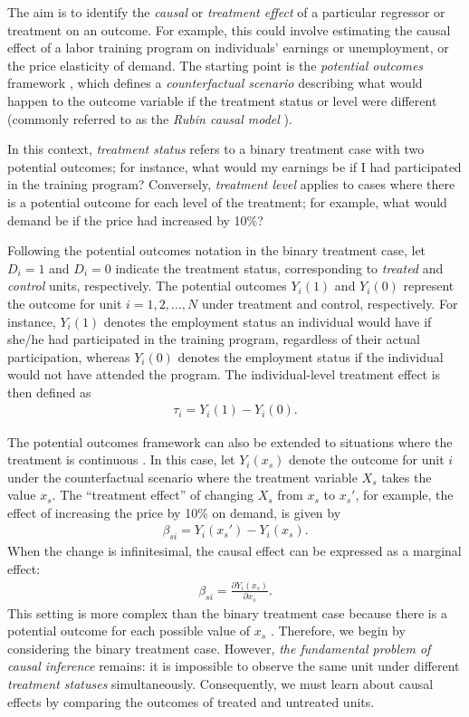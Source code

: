 The aim is to identify the \textit{causal} or \textit{treatment effect} of a particular regressor or treatment on an outcome. For example, this could involve estimating the causal effect of a labor training program on individuals’ earnings or unemployment, or the price elasticity of demand. The starting point is the \textit{potential outcomes} framework \cite{rubin1974}, which defines a \textit{counterfactual scenario} describing what would happen to the outcome variable if the treatment status or level were different (commonly referred to as the \textit{Rubin causal model} \cite{holland1986statistics}).

In this context, \textit{treatment status} refers to a binary treatment case with two potential outcomes; for instance, what would my earnings be if I had participated in the training program? Conversely, \textit{treatment level} applies to cases where there is a potential outcome for each level of the treatment; for example, what would demand be if the price had increased by 10\%?

Following the potential outcomes notation in the binary treatment case, let $D_i = 1$ and $D_i = 0$ indicate the treatment status, corresponding to \textit{treated} and \textit{control} units, respectively. The potential outcomes $Y_i(1)$ and $Y_i(0)$ represent the outcome for unit $i = 1, 2, \dots, N$ under treatment and control, respectively. For instance, $Y_i(1)$ denotes the employment status an individual would have if she/he had participated in the training program, regardless of their actual participation, whereas $Y_i(0)$ denotes the employment status if the individual would not have attended the program. The individual-level treatment effect is then defined as
\begin{align*}
	\tau_i = Y_i(1) - Y_i(0).
\end{align*}

The potential outcomes framework can also be extended to situations where the treatment is continuous \cite{imbens2014ivperspective}. In this case, let $Y_i(x_s)$ denote the outcome for unit $i$ under the counterfactual scenario where the treatment variable $X_s$ takes the value $x_s$. The ``treatment effect'' of changing $X_s$ from $x_s$ to $x_s'$, for example, the effect of increasing the price by 10\% on demand, is given by
\begin{align*}
	\beta_{si} = Y_i(x_s') - Y_i(x_s).
\end{align*}
When the change is infinitesimal, the causal effect can be expressed as a marginal effect:
\begin{align*}
	\beta_{si} =\frac{\partial Y_i(x_s)}{\partial x_s}.
\end{align*}
This setting is more complex than the binary treatment case because there is a potential outcome for each possible value of $x_s$ \cite{gill2001causal}. Therefore, we begin by considering the binary treatment case. However, \textit{the fundamental problem of causal inference} \cite{holland1986statistics} remains: it is impossible to observe the same unit under different \textit{treatment statuses} simultaneously. Consequently, we must learn about causal effects by comparing the outcomes of treated and untreated units.

